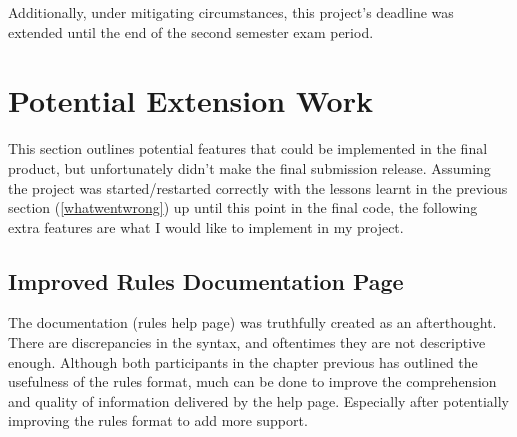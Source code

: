 Additionally, under mitigating circumstances, this project's deadline was extended until the end of the second semester exam period. 

\section{Potential Extension Work} \label{potential_extension_work}
This section outlines potential features that could be implemented in the final product, but unfortunately didn't make the final submission release. Assuming the project was started/restarted correctly with the lessons learnt in the previous section (\ref{whatwentwrong}) up until this point in the final code, the following extra features are what I would like to implement in my project. 

\subsection{Improved Rules Documentation Page}
The documentation (rules help page) was truthfully created as an afterthought. There are discrepancies in the syntax, and oftentimes they are not descriptive enough. Although both participants in the chapter previous has outlined the usefulness of the rules format, much can be done to improve the comprehension and quality of information delivered by the help page. Especially after potentially improving the rules format to add more support. 

\newpage
